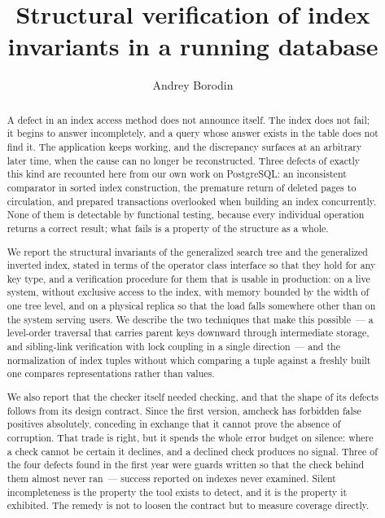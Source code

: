 \documentclass[11pt, a4paper]{article}
\title{Structural verification of index invariants in a running database}
\author{Andrey Borodin}
\date{}
\begin{document}
\maketitle

\begin{abstract}
A defect in an index access method does not announce itself. The index does not
fail; it begins to answer incompletely, and a query whose answer exists in the
table does not find it. The application keeps working, and the discrepancy
surfaces at an arbitrary later time, when the cause can no longer be
reconstructed. Three defects of exactly this kind are recounted here from our own
work on PostgreSQL: an inconsistent comparator in sorted index construction, the
premature return of deleted pages to circulation, and prepared transactions
overlooked when building an index concurrently. None of them is detectable by
functional testing, because every individual operation returns a correct result;
what fails is a property of the structure as a whole.

We report the structural invariants of the generalized search tree and the
generalized inverted index, stated in terms of the operator class interface so
that they hold for any key type, and a verification procedure for them that is
usable in production: on a live system, without exclusive access to the index,
with memory bounded by the width of one tree level, and on a physical replica so
that the load falls somewhere other than on the system serving users. We
describe the two techniques that make this possible~--- a level-order traversal
that carries parent keys downward through intermediate storage, and sibling-link
verification with lock coupling in a single direction~--- and the normalization
of index tuples without which comparing a tuple against a freshly built one
compares representations rather than values.

We also report that the checker itself needed checking, and that the shape of its
defects follows from its design contract. Since the first version, amcheck has
forbidden false positives absolutely, conceding in exchange that it cannot prove
the absence of corruption. That trade is right, but it spends the whole error
budget on silence: where a check cannot be certain it declines, and a declined
check produces no signal. Three of the four defects found in the first year were
guards written so that the check behind them almost never ran~--- success
reported on indexes never examined. Silent incompleteness is the property the
tool exists to detect, and it is the property it exhibited. The remedy is not to
loosen the contract but to measure coverage directly.
\end{abstract}
\end{document}
